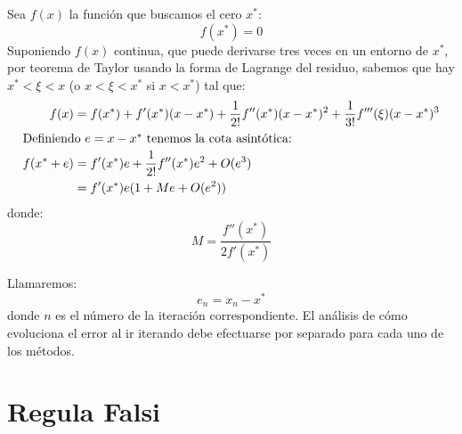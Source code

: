   Sea \(f(x)\) la función que buscamos el cero \(x^*\):
  \begin{equation*}
    f(x^*)
     = 0
  \end{equation*}
  Suponiendo \(f(x)\) continua,
  que puede derivarse tres veces en un entorno de \(x^*\),
  por teorema de Taylor
  usando la forma de Lagrange del residuo,
  sabemos que hay \(x^* < \xi < x\)
  (o \(x < \xi < x^*\) si \(x < x^*\))
  tal que:
  \begin{align}
    f(x)
      &= f(x^*)
           + f'(x^*) (x - x^*)
           + \frac{1}{2!} f''(x^*) (x - x^*)^2
           + \frac{1}{3!} f'''(\xi) (x - x^*)^3
              \notag \\
  \intertext{Definiendo \(e = x - x^*\) tenemos la cota asintótica:}
    f(x^* + e)
      &= f'(x^*) e + \frac{1}{2!} f''(x^*) e^2 + O(e^3) \\
      &= f'(x^*) e (1 + M e + O(e^2))
              \label{eq:f-aproximado}
  \end{align}
  donde:
  \begin{equation*}
    M
      = \frac{f''(x^*)}{2 f'(x^*)}
  \end{equation*}

  Llamaremos:
  \begin{equation}
    e_n
      = x_n - x^*
  \end{equation}
  donde \(n\) es el número de la iteración correspondiente.
  El análisis de cómo evoluciona el error al ir iterando
  debe efectuarse por separado para cada uno de los métodos.

\section{Regula Falsi}

